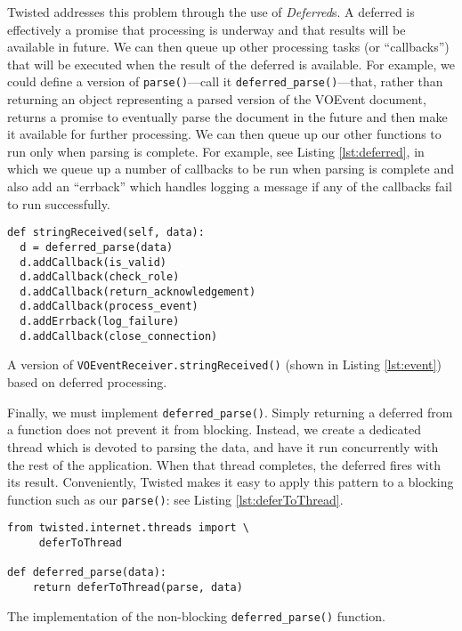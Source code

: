 \documentclass[5p,authoryear]{elsarticle}
\begin{document}
Twisted addresses this problem through the use of \textit{Deferred}s. A
deferred is effectively a promise that processing is underway and that results
will be available in future. We can then queue up other processing tasks (or
``callbacks'') that will be executed when the result of the deferred is
available. For example, we could define a version of
\texttt{parse()}---call it
\texttt{deferred\_parse()}---that, rather than returning an object
representing a parsed version of the VOEvent document, returns a promise to
eventually parse the document in the future and then make it available for
further processing. We can then queue up our other functions to run only when
parsing is complete. For example, see Listing \ref{lst:deferred}, in which we
queue up a number of callbacks to be run when parsing is complete and also add
an ``errback'' which handles logging a message if any of the callbacks fail to
run successfully.

\begin{listing}
\begin{verbatim}
def stringReceived(self, data):
  d = deferred_parse(data)
  d.addCallback(is_valid)
  d.addCallback(check_role)
  d.addCallback(return_acknowledgement)
  d.addCallback(process_event)
  d.addErrback(log_failure)
  d.addCallback(close_connection)
\end{verbatim}
\caption{A version of \texttt{VOEventReceiver.stringReceived()} (shown in
Listing \ref{lst:event}) based on deferred processing.}
\label{lst:deferred}
\end{listing}

Finally, we must implement \texttt{deferred\_parse()}.  Simply returning a
deferred from a function does not prevent it from blocking.  Instead, we
create a dedicated thread which is devoted to parsing the data, and have it
run concurrently with the rest of the application. When that thread completes,
the deferred fires with its result. Conveniently, Twisted makes it easy to
apply this pattern to a blocking function such as our \texttt{parse()}: see
Listing \ref{lst:deferToThread}.

\begin{listing}
\begin{verbatim}
from twisted.internet.threads import \
     deferToThread

def deferred_parse(data):
    return deferToThread(parse, data)
\end{verbatim}
\caption{The implementation of the non-blocking \texttt{deferred\_parse()} function.}
\label{lst:deferToThread}
\end{listing}
\end{document}
